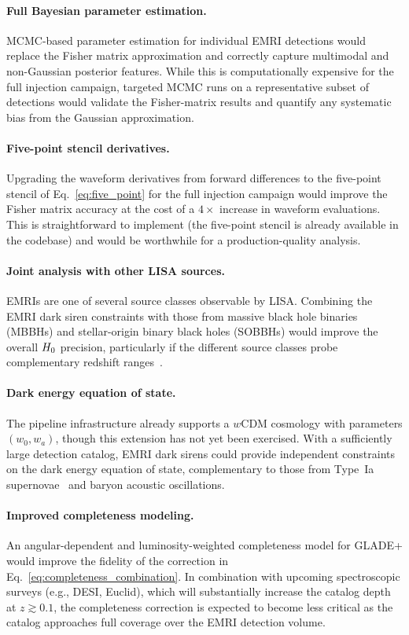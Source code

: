 \paragraph{Full Bayesian parameter estimation.}
MCMC-based parameter estimation for individual EMRI detections would
replace the Fisher matrix approximation and correctly capture multimodal
and non-Gaussian posterior features.  While this is computationally
expensive for the full injection campaign, targeted MCMC runs on a
representative subset of detections would validate the Fisher-matrix
results and quantify any systematic bias from the Gaussian
approximation.

\paragraph{Five-point stencil derivatives.}
Upgrading the waveform derivatives from forward differences to the
five-point stencil of Eq.~\eqref{eq:five_point} for the full injection
campaign would improve the Fisher matrix accuracy at the cost of a
$4\times$ increase in waveform evaluations.  This is straightforward to
implement (the five-point stencil is already available in the codebase)
and would be worthwhile for a production-quality analysis.

\paragraph{Joint analysis with other LISA sources.}
EMRIs are one of several source classes observable by LISA.  Combining
the EMRI dark siren constraints with those from massive black hole
binaries (MBBHs) and stellar-origin binary black holes (SOBBHs) would
improve the overall $H_0$ precision, particularly if the different
source classes probe complementary redshift
ranges~\cite{LISA:2024hlh,Chen:2017rfc}.

\paragraph{Dark energy equation of state.}
The pipeline infrastructure already supports a $w$CDM cosmology with
parameters $(w_0, w_a)$, though this extension has not yet been
exercised.  With a sufficiently large detection catalog, EMRI dark
sirens could provide independent constraints on the dark energy equation
of state, complementary to those from Type~Ia
supernovae~\cite{DES:2024tys} and baryon acoustic
oscillations.

\paragraph{Improved completeness modeling.}
An angular-dependent and luminosity-weighted completeness model for
GLADE+ would improve the fidelity of the correction in
Eq.~\eqref{eq:completeness_combination}.  In combination with upcoming
spectroscopic surveys (e.g., DESI, Euclid), which will substantially
increase the catalog depth at $z \gtrsim 0.1$, the completeness
correction is expected to become less critical as the catalog approaches
full coverage over the EMRI detection volume.

